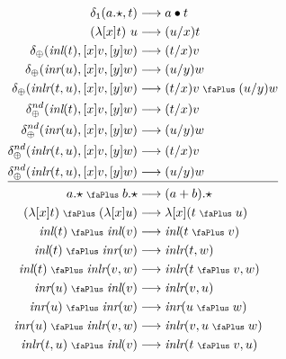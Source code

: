 \documentclass[screen, sigconf,authorversion,nonacm]{acmart}
\theoremstyle{acmdefinition}
\numberwithin{equation}{section}
\newcommand\abstr[1]{[#1]}
\newcommand\inl{\mbox{\it inl}}
\newcommand\inr{\mbox{\it inr}}
\newcommand\inlr{\mbox{\it inlr}}
\newcommand\plus{\mathrel{\text{\normalfont\scalebox{0.7}{\faPlus}}}}
\newcommand\one{\ensuremath{\mathtt 1}}
\newcommand\elimone{\delta_{\one}}
\newcommand\elimplus{\delta_{\oplus}}
\begin{document}
\begin{figure}[t]
    \begin{align}
      \elimone(a.\star,t) & \longrightarrow  a \bullet t
    \label{ll:ruelimone}\\
      (\lambda \abstr{x}t)~u & \longrightarrow  (u/x)t
    \label{ll:rubeta}\\
      \elimplus(\inl(t),\abstr{x}v,\abstr{y}w) & \longrightarrow  (t/x)v
    \label{ll:ruelimoplusinl}\\
      \elimplus(\inr(u),\abstr{x}v,\abstr{y}w) & \longrightarrow  (u/y)w
    \label{ll:ruelimoplusinr}\\
      \elimplus(\inlr(t,u),\abstr{x}v,\abstr{y}w) & \longrightarrow  (t/x)v \plus (u/y)w
    \label{ll:ruelimoplusinlr}\\
    \elimplus^{nd}(\inl(t),\abstr{x}v,\abstr{y}w) & \longrightarrow  (t/x)v 
    \label{ll:ruelimoplusndinl}\\
    \elimplus^{nd}(\inr(u),\abstr{x}v,\abstr{y}w) & \longrightarrow
    (u/y)w 
    \label{ll:ruelimoplusndinr}\\
    \elimplus^{nd}(\inlr(t,u),\abstr{x}v,\abstr{y}w) & \longrightarrow  (t/x)v 
    \label{ll:ruelimoplusndinlr1}\\
    \elimplus^{nd}(\inlr(t,u),\abstr{x}v,\abstr{y}w) & \longrightarrow
    (u/y)w 
    \label{ll:ruelimoplusndinlr2}\\[1pt]\hline\nonumber\\[-11pt]
      {a.\star} \plus b.\star&\longrightarrow  (a+b).\star
    \label{ll:rusumstar}\\
      (\lambda \abstr{x}t) \plus (\lambda \abstr{x}u) & \longrightarrow  \lambda \abstr{x}(t \plus u)
    \label{ll:rusumlam}\\
    \inl(t) \plus \inl(v) & \longrightarrow  \inl(t \plus v)
    \label{ll:rusuminl}\\
    \inl(t) \plus \inr(w) & \longrightarrow  \inlr(t,w)
    \label{ll:rusuminlinr} \\
    \inl(t) \plus \inlr(v,w) & \longrightarrow  \inlr(t \plus v,w)
    \label{ll:rusuminlinlr}\\
    \inr(u) \plus \inl(v) & \longrightarrow  \inlr(v,u)
    \label{ll:rusuminrinl}\\
    \inr(u) \plus \inr(w) & \longrightarrow  \inr(u \plus w) 
    \label{ll:rusuminr}\\
    \inr(u) \plus \inlr(v,w) & \longrightarrow  \inlr(v,u \plus w)
    \label{ll:rusuminrinlr}\\
    \inlr(t,u) \plus \inl(v) & \longrightarrow  \inlr(t \plus v,u)

\end{align}
\end{figure}
\end{document}
